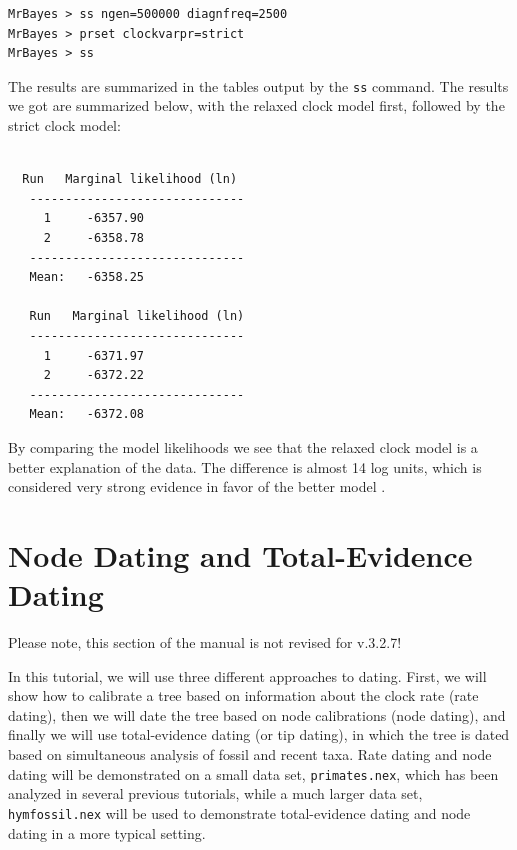 \documentclass[12pt]{book}
\newcommand{\ttt}[1]{\texttt{#1}}
\begin{document}
\small
\begin{singlespacing}
\begin{verbatim}
MrBayes > ss ngen=500000 diagnfreq=2500
MrBayes > prset clockvarpr=strict
MrBayes > ss
\end{verbatim}
\end{singlespacing}
\normalsize

The results are summarized in the tables output by the \ttt{ss} command. The results we got are
summarized below, with the relaxed clock model first, followed by the strict clock model:

\begin{singlespacing}
\footnotesize
\begin{verbatim}

  Run   Marginal likelihood (ln)
   ------------------------------
     1     -6357.90   
     2     -6358.78   
   ------------------------------
   Mean:   -6358.25

   Run   Marginal likelihood (ln)
   ------------------------------
     1     -6371.97   
     2     -6372.22   
   ------------------------------
   Mean:   -6372.08

\end{verbatim}
\end{singlespacing}
\normalsize

By comparing the model likelihoods we see that the relaxed clock model is a better explanation of
the data. The difference is almost 14 log units, which is considered very strong evidence in favor
of the better model \citep{kass95}.


\section{Node Dating and Total-Evidence Dating}

\vspace{10 pt}
{\large\color{red} Please note, this section of the manual is not revised for v.3.2.7!}

In this tutorial, we will use three different approaches to dating. First, we will show how to
calibrate a tree based on information about the clock rate (rate dating), then we will date the
tree based on node calibrations (node dating), and finally we will use total-evidence dating (or
tip dating), in which the tree is dated based on simultaneous analysis of fossil and recent taxa.
Rate dating and node dating will be demonstrated on a small data set, \ttt{primates.nex}, which has
been analyzed in several previous tutorials, while a much larger data set, \ttt{hymfossil.nex} will
be used to demonstrate total-evidence dating and node dating in a more typical setting.
\end{document}
